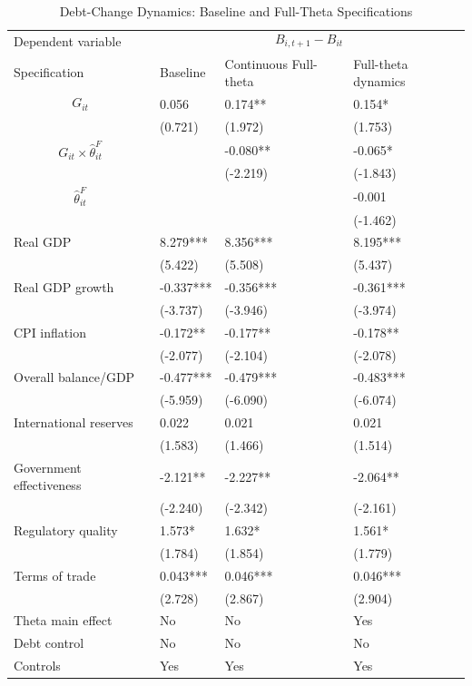 \begin{table}[H]\centering
\begin{threeparttable}
\caption{Debt-Change Dynamics: Baseline and Full-Theta Specifications}
\label{tab:debt_change_combined_fulltheta}
\scriptsize
\begin{tabularx}{\textwidth}{lYYY}
\toprule
Dependent variable &  \\
\cmidrule(lr){2-4}
Specification & Baseline & Continuous Full-theta & Full-theta dynamics \\
\midrule
$$G_{it}$$ & 0.056 & 0.174** & 0.154* \\
 & (0.721) & (1.972) & (1.753) \\
$$G_{it}\times\widehat{\theta}^{F}_{it}$$ &  & -0.080** & -0.065* \\
 &  & (-2.219) & (-1.843) \\
$$\widehat{\theta}^{F}_{it}$$ &  &  & -0.001 \\
 &  &  & (-1.462) \\
Real GDP & 8.279*** & 8.356*** & 8.195*** \\
 & (5.422) & (5.508) & (5.437) \\
Real GDP growth & -0.337*** & -0.356*** & -0.361*** \\
 & (-3.737) & (-3.946) & (-3.974) \\
CPI inflation & -0.172** & -0.177** & -0.178** \\
 & (-2.077) & (-2.104) & (-2.078) \\
Overall balance/GDP & -0.477*** & -0.479*** & -0.483*** \\
 & (-5.959) & (-6.090) & (-6.074) \\
International reserves & 0.022 & 0.021 & 0.021 \\
 & (1.583) & (1.466) & (1.514) \\
Government effectiveness & -2.121** & -2.227** & -2.064** \\
 & (-2.240) & (-2.342) & (-2.161) \\
Regulatory quality & 1.573* & 1.632* & 1.561* \\
 & (1.784) & (1.854) & (1.779) \\
Terms of trade & 0.043*** & 0.046*** & 0.046*** \\
 & (2.728) & (2.867) & (2.904) \\
\midrule
Theta main effect & No & No & Yes \\
Debt control & No & No & No \\
Controls & Yes & Yes & Yes \\

\end{tabularx}
\end{threeparttable}
\end{table}
